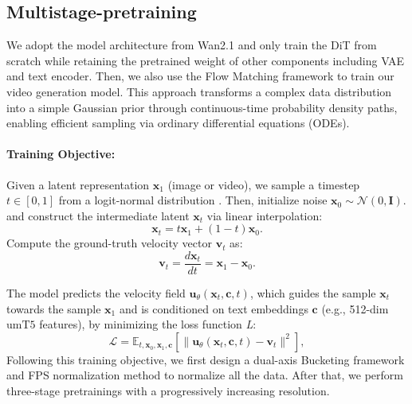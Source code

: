 \documentclass{article}
\begin{document}
{\subsection{Multistage-pretraining}
\label{subsec:pretraining}
We adopt the model architecture from Wan2.1\cite{wan2025} and only train the DiT from scratch while retaining the pretrained weight of other components including VAE and text encoder. Then, we also use the Flow Matching framework \cite{lipman2022flow,esser2024scaling} to train our video generation model. This approach transforms a complex data distribution into a simple Gaussian prior through continuous-time probability density paths, enabling efficient sampling via ordinary differential equations (ODEs). 
\paragraph{Training Objective:}
Given a latent representation $\mathbf{x}_1$ (image or video), we sample a timestep $t \in [0, 1]$ from a logit-normal distribution \cite{esser2024scaling}.  Then, initialize noise $\mathbf{x}_0 \sim \mathcal{N}(0, \mathbf{I})$. and construct the intermediate latent $\mathbf{x}_t$ via linear interpolation:  
   \begin{equation}
     \mathbf{x}_t = t \mathbf{x}_1 + (1 - t) \mathbf{x}_0.
   \end{equation}  
Compute the ground-truth velocity vector $\mathbf{v}_t$ as:  
   \begin{equation}
     \mathbf{v}_t = \frac{d\mathbf{x}_t}{dt} = \mathbf{x}_1 - \mathbf{x}_0.
   \end{equation}  

The model predicts the velocity field $\mathbf{u}_\theta(\mathbf{x}_t, \mathbf{c}, t)$, which guides the sample $\mathbf{x}_t$ towards the sample $\mathbf{x}_1$ and is conditioned on text embeddings $\mathbf{c}$ (e.g., 512-dim $\text{umT5}$ features), by minimizing the loss function \textit{L}:  
\begin{equation}
  \mathcal{L} = \mathbb{E}_{t, \mathbf{x}_0, \mathbf{x}_1, \mathbf{c}} \left[ \| \mathbf{u}_\theta(\mathbf{x}_t, \mathbf{c}, t) - \mathbf{v}_t \|^2 \right],
\end{equation}  
Following this training objective, we first design a dual-axis Bucketing framework and FPS normalization method to normalize all the data. After that, we perform three-stage pretrainings with a progressively increasing resolution. 
}
\end{document}
